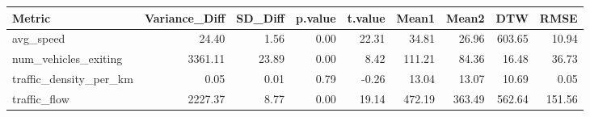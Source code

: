 \begin{table}[ht]
\centering
\begin{tabular}{lrrrrrrrr}
  \hline
Metric & Variance\_Diff & SD\_Diff & p.value & t.value & Mean1 & Mean2 & DTW & RMSE \\ 
  \hline
avg\_speed & 24.40 & 1.56 & 0.00 & 22.31 & 34.81 & 26.96 & 603.65 & 10.94 \\ 
  num\_vehicles\_exiting & 3361.11 & 23.89 & 0.00 & 8.42 & 111.21 & 84.36 & 16.48 & 36.73 \\ 
  traffic\_density\_per\_km & 0.05 & 0.01 & 0.79 & -0.26 & 13.04 & 13.07 & 10.69 & 0.05 \\ 
  traffic\_flow & 2227.37 & 8.77 & 0.00 & 19.14 & 472.19 & 363.49 & 562.64 & 151.56 \\ 
   \hline
\end{tabular}
\end{table}
